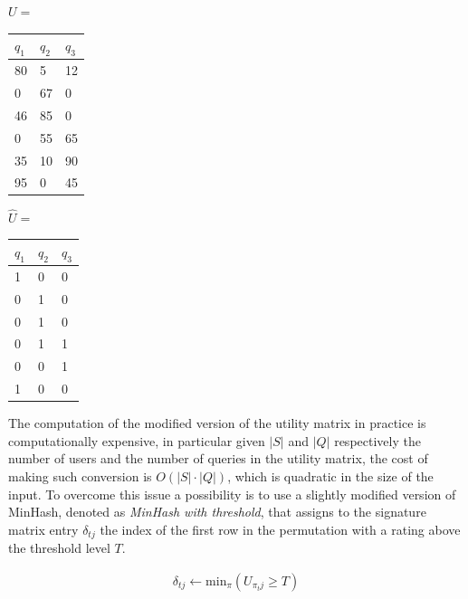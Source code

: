 \vspace{1em}
\begin{minipage}{0.5\linewidth}
    \centering
    $U=$
    \begin{tabular}{|l|l|l|}
    \hline
        \textbf{$q_1$} & \textbf{$q_2$} & \textbf{$q_3$} \\ \hline
        80 & 5 & 12 \\ \hline
        0 & 67 & 0 \\ \hline
        46 & 85 & 0 \\ \hline
        0 & 55 & 65 \\ \hline
        35 & 10 & 90 \\ \hline
        95 & 0 & 45 \\ \hline
    \end{tabular}
\end{minipage}
\begin{minipage}{0.5\linewidth}
    $\widehat{U}=$
    \begin{tabular}{|l|l|l|}
    \hline
        \textbf{$q_1$} & \textbf{$q_2$} & \textbf{$q_3$} \\ \hline
        1 & 0 & 0 \\ \hline
        0 & 1 & 0 \\ \hline
        0 & 1 & 0 \\ \hline
        0 & 1 & 1 \\ \hline
        0 & 0 & 1 \\ \hline
        1 & 0 & 0 \\ \hline
    \end{tabular}
\end{minipage}

\vspace{1em}

The computation of the modified version of the utility matrix in practice is computationally expensive, in particular given $|S|$ and $|Q|$ respectively the number of users and the number of queries in the utility matrix, the cost of making such conversion is $O(|S| \cdot |Q|)$, which is quadratic in the size of the input. To overcome this issue a possibility is to use a slightly modified version of MinHash, denoted as \emph{MinHash with threshold}, that assigns to the signature matrix entry $\delta_{tj}$ the index of the first row in the permutation with a rating above the threshold level $T$.

\begin{equation}
\begin{aligned}
\delta_{tj} \gets \text{min}_\pi (U_{\pi_tj} \geq T)
\end{aligned}
\end{equation}

